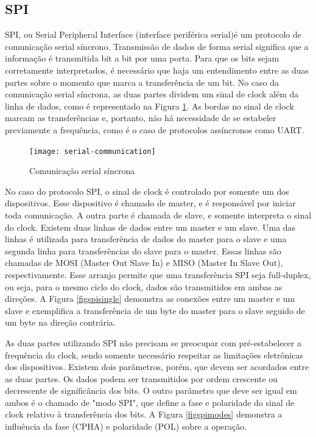 \documentclass[11pt]{article}
\begin{document}
\subsection{SPI}
\tab SPI, ou Serial Peripheral Interface (interface periférica serial)é um protocolo de comunicação serial síncrono. Transmissão de dados de forma serial significa que a informação é transmitida bit a bit por uma porta. Para que os bits sejam corretamente interpretados, é necessário que haja um entendimento entre as duas partes sobre o momento que marca a transferência de um bit. No caso da comunicação serial síncrona, as duas partes dividem um sinal de clock além da linha de dados, como é representado na Figura \ref{figserial}. As bordas no sinal de clock marcam as transferências e, portanto, não há necessidade de se estabeler previamente a frequência, como é o caso de protocolos assíncronos como UART. 
\begin{figure}
    \centering
    \texttt{[image: serial-communication]}
    \caption{Comunicação serial síncrona}
    \label{figserial}
\end{figure}
\par No caso do protocolo SPI, o sinal de clock é controlado por somente um dos dispositivos. Esse dispositivo é chamado de master, e é responsável por iniciar toda comunicação. A outra parte é chamada de slave, e somente interpreta o sinal do clock. Existem duas linhas de dados entre um master e um slave. Uma das linhas é utilizada para transferência de dados do master para o slave e uma segunda linha para transferências do slave para o master. Essas linhas são chamadas de MOSI (Master Out Slave In) e MISO (Master In Slave Out), respectivamente. Esse arranjo permite que uma transferência SPI seja full-duplex, ou seja, para o mesmo ciclo do clock, dados são transmitidos em ambas as direções. A Figura \ref{figspisingle} demonstra as conexões entre um master e um slave e exemplifica a transferência de um byte do master para o slave seguido de um byte na direção contrária.
\par As duas partes utilizando SPI não precisam se preocupar com pré-estabelecer a frequência do clock, sendo somente necessário respeitar as limitações eletrônicas dos dispositivos. Existem dois parâmetros, porém, que devem ser acordados entre as duas partes. Os dados podem ser transmitidos por ordem crescente ou decrescente de significância dos bits. O outro parâmetro que deve ser igual em ambos é o chamado de "modo SPI", que define a fase e polaridade do sinal de clock relativo à transferência dos bits. A Figura \ref{figspimodes} demonstra a influência da fase (CPHA) e polaridade (POL) sobre a operação.
\end{document}
